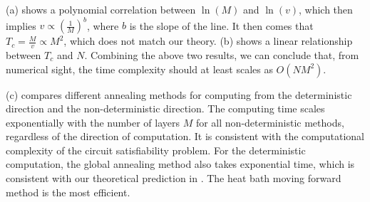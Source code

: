 \documentclass[twocolumn,superscriptaddress,english,showpacs,longbibliography]{revtex4-2}
\newcommand{\jinguo}[1]{[{\color{blue}{JGL: #1}}]}
\newcommand{\ym}[1]{[{\color{red}{YM: #1}}]}
\begin{document}
 (a) shows a polynomial correlation between $\ln(M)$ and $\ln(v)$, which then
implies $v \propto (\frac{1}{M})^{b}$, where $b$ is the slope of the line. It then comes that $T_{c} = \frac{M}{v} \propto M^2$, which does not match our theory.
 (b) shows a linear relationship between $T_c$ and $N$.
Combining the above two results, we can conclude that, from numerical sight, the time complexity should at least scales as $O(NM^2)$.

(c) compares different annealing methods for computing from the deterministic direction and the non-deterministic direction.
The computing time scales exponentially with the number of layers $M$ for all non-deterministic methods, regardless of the direction of computation.
It is consistent with the computational complexity of the circuit satisfiability problem.
For the deterministic computation, the global annealing method also takes exponential time, which is consistent with our theoretical prediction in .
The heat bath moving forward method is the most efficient.


\end{document}
